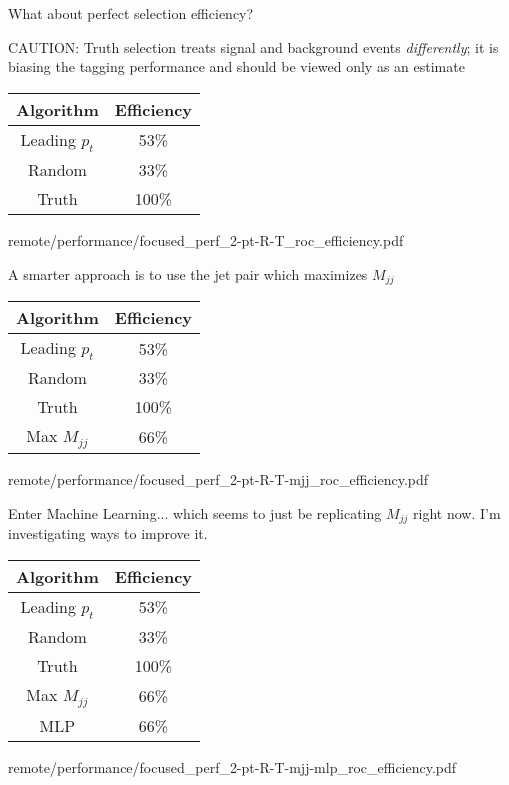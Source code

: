     { \footnotesize
        What about perfect selection efficiency?

        {\tiny CAUTION: Truth selection treats signal and background events \textit{differently};
        it is biasing the tagging performance and should be viewed only as an estimate}

        \vspace{5mm}

        \begin{tabular}{|c|c|}\hline
        Algorithm & Efficiency \\ \hline
        Leading $p_t$ & 53\% \\ \hline
        Random & 33\% \\ \hline
        Truth & 100\% \\ \hline
        \end{tabular}
    }
    {remote/performance/focused_perf_2-pt-R-T_roc_efficiency.pdf}

    { \footnotesize
        A smarter approach is to use the jet pair which maximizes $M_{jj}$

        \vspace{5mm}

        \begin{tabular}{|c|c|}\hline
        Algorithm & Efficiency \\ \hline
        Leading $p_t$ & 53\% \\ \hline
        Random & 33\% \\ \hline
        Truth & 100\% \\ \hline
        Max $M_{jj}$& 66\% \\ \hline
        \end{tabular}
    }
    {remote/performance/focused_perf_2-pt-R-T-mjj_roc_efficiency.pdf}

    { \footnotesize
        Enter Machine Learning... which seems to just be replicating $M_{jj}$ right now.
        I'm investigating ways to improve it.

        \vspace{5mm}

        \begin{tabular}{|c|c|}\hline
        Algorithm & Efficiency \\ \hline
        Leading $p_t$ & 53\% \\ \hline
        Random & 33\% \\ \hline
        Truth & 100\% \\ \hline
        Max $M_{jj}$ & 66\% \\ \hline
        MLP & 66\% \\ \hline
        \end{tabular}
    }
    {remote/performance/focused_perf_2-pt-R-T-mjj-mlp_roc_efficiency.pdf}

